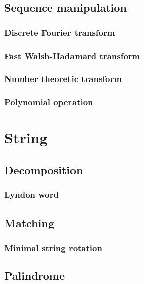 \documentclass[titlepage,a4paper,10pt]{article}
\begin{document}
\begin{multicols}{2}
\begin{spacing}{0.8}
{			\subsection{Sequence manipulation}
				\subsubsection{Discrete Fourier transform}
					
				\subsubsection{Fast Walsh-Hadamard transform}
					
				\subsubsection{Number theoretic transform}
					
				\subsubsection{Polynomial operation}
					
		\section{String}
			\subsection{Decomposition}
				\subsubsection{Lyndon word}
					
			\subsection{Matching}
				\subsubsection{Minimal string rotation}
					
			\subsection{Palindrome}
}
\end{spacing}
\end{multicols}
\end{document}
